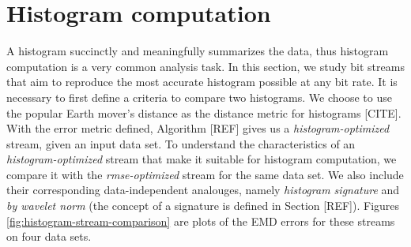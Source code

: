 
\section{Histogram computation}

A histogram succinctly and meaningfully summarizes the data, thus histogram computation is a very
common analysis task. In this section, we study bit streams that aim to reproduce the most accurate
histogram possible at any bit rate. It is necessary to first define a criteria to compare two
histograms. We choose to use the popular Earth mover's distance as the distance metric for
histograms [CITE]. With the error metric defined, Algorithm [REF] gives us a
\emph{histogram-optimized} stream, given an input data set. To understand the characteristics of an
\emph{histogram-optimized} stream that make it suitable for histogram computation, we compare it
with the \emph{rmse-optimized} stream for the same data set. We also include their corresponding
data-independent analouges, namely \emph{histogram signature} and \emph{by wavelet norm} (the
concept of a signature is defined in Section [REF]). Figures \ref{fig:histogram-stream-comparison}
are plots of the EMD errors for these streams on four data sets.

